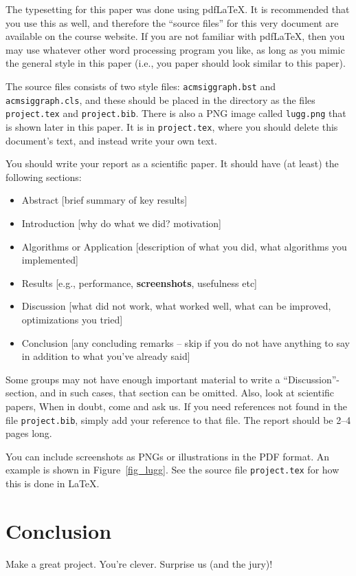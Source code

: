 \documentclass{acmsiggraph}               %
\begin{document}
The typesetting for this paper was done using pdf\LaTeX. It is recommended that you
use this as well, and therefore the ``source files'' for this very document are
available on the course website. If you are not familiar with pdf\LaTeX, then
you may use whatever other word processing program you like, as long as you mimic
the general style in this paper (i.e., you paper should look similar to
this paper).

The source files consists of two style files: \texttt{acmsiggraph.bst}
and \texttt{acmsiggraph.cls}, and these should be placed in the directory as the
files \texttt{project.tex} and \texttt{project.bib}. There is also a PNG image called
\texttt{lugg.png} that is shown later in this paper.
It is in \texttt{project.tex}, where you should delete this document's text,
and instead write your own text.

You should write your report as a scientific paper. It should have (at least)
the following sections:
\begin{itemize}
    \item Abstract [brief summary of key results]
    \item Introduction [why do what we did? motivation]
    \item Algorithms or Application [description of what you did, what algorithms you implemented]
    \item Results [e.g., performance, \textbf{screenshots}, usefulness etc]
    \item Discussion [what did not work, what worked well, what can be improved, optimizations you tried]
    \item Conclusion [any concluding remarks -- skip if you do not have anything to say in addition to what you've already said]
\end{itemize}
Some groups may not have enough important material to write a ``Discussion''-section,
and in such cases, that section can be omitted. Also, look at scientific papers,
When in doubt, come and ask us.
If you need references not found in the file \texttt{project.bib}, simply add your reference to
that file. The report should be 2--4 pages long.

You can include screenshots as PNGs or illustrations in the PDF format.
An example is shown in Figure~\ref{fig_lugg}. See the source file \texttt{project.tex}
for how this is done in \LaTeX.

\section{Conclusion}
Make a great project. You're clever. Surprise us (and the jury)!



\end{document}
